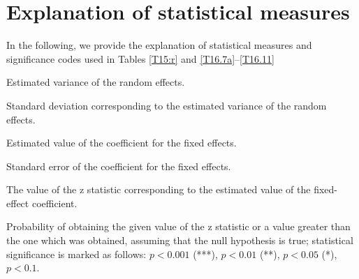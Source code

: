 \chapter{Explanation of statistical measures}\label{s}
In the following, we provide the explanation of statistical measures  and significance codes used in Tables \ref{T15:r} and \ref{T16.7a}--\ref{T16.11}

\begin{description}[font=\normalfont]
\item[Var.:] Estimated variance of the random effects.
\item[SD:]  Standard deviation corresponding to the estimated variance of the random effects.
\item[Est.:] Estimated value of the coefficient for the fixed effects.
\item[SE:] Standard error of the coefficient for the fixed effects.
\item[$z$:] The value of the z statistic corresponding to the estimated value of the fixed-effect coefficient.
\item[$\text{Pr}(>|z|)$:] Probability of obtaining the given value of the z statistic or a value greater than the one which was obtained, assuming that the null hypothesis is true; statistical significance is marked as follows: $p<0.001$ (***), $p<0.01$ (**), $p<0.05$ (*), $p<0.1$.
\end{description}
